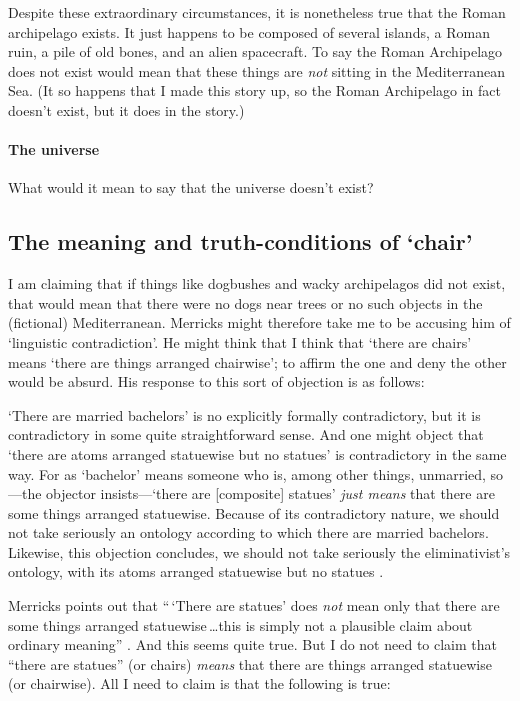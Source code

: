 \documentclass[11pt]{article}
\newenvironment{squote}{%
\begin{spacing}{1}
       	\begin{list}{}{%
\setlength{\labelwidth}{0pt}%
\rightmargin\leftmargin%
}
\item\relax
}{%
\end{list}%
\end{spacing}
}
\begin{document}
\begin{spacing}{1.25}
Despite these extraordinary circumstances, it is nonetheless true that
the Roman archipelago exists.  It just happens to be composed of
several islands, a Roman ruin, a pile of old bones, and an alien
spacecraft.  To say the Roman Archipelago does not exist would mean
that these things are {\em not} sitting in the Mediterranean Sea.  (It
so happens that I made this story up, so the Roman Archipelago in fact
doesn't exist, but it does in the story.)

\paragraph{The universe} \label{world}
What would it mean to say that the universe doesn't exist?

\subsection{The meaning and truth-conditions of `chair'}
\label{meaning}
I am claiming that if things like dogbushes and wacky archipelagos did
not exist, that would mean that there were no dogs near trees or no
such objects in the (fictional) Mediterranean.  Merricks might
therefore take me to be accusing him of `linguistic contradiction'.
He might think that I think that `there are chairs' means `there are
things arranged chairwise'; to affirm the one and deny the other would
be absurd.  His response to this sort of objection is as follows:

\begin{squote}
`There are married bachelors' is no explicitly formally contradictory,
  but it is contradictory in some quite straightforward sense.  And
  one might object that `there are atoms arranged statuewise but no
  statues' is contradictory in the same way.  For as `bachelor' means
  someone who is, among other things, unmarried, so---the objector
  insists---`there are [composite] statues' {\em just means} that
  there are some things arranged statuewise.  Because of its
  contradictory nature, we should not take seriously an ontology
  according to which there are married bachelors.  Likewise, this
  objection concludes, we should not take seriously the
  eliminativist's ontology, with its atoms arranged statuewise but no
  statues \citeyearpar[13]{merricks2001a}.
\end{squote}

Merricks points out that ``\,`There are statues' does {\em not} mean
only that there are some things arranged statuewise\,\ldots this is
simply not a plausible claim about ordinary meaning''
\citeyearpar[13]{merricks2001a}.  And this seems quite true.  But I do
not need to claim that ``there are statues'' (or chairs) {\em means}
that there are things arranged statuewise (or chairwise).  All I need
to claim is that the following is true:


\end{spacing}
\end{document}
